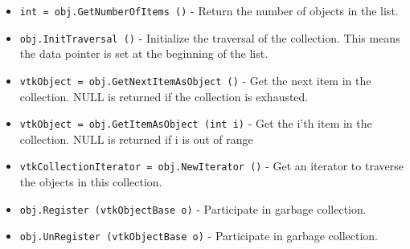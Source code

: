 \begin{itemize}
\item  \verb|int = obj.GetNumberOfItems ()| -  Return the number of objects in the list.

\item  \verb|obj.InitTraversal ()| -  Initialize the traversal of the collection. This means the data pointer
 is set at the beginning of the list.

\item  \verb|vtkObject = obj.GetNextItemAsObject ()| -  Get the next item in the collection. NULL is returned if the collection
 is exhausted.

\item  \verb|vtkObject = obj.GetItemAsObject (int i)| -  Get the i'th item in the collection. NULL is returned if i is out
 of range

\item  \verb|vtkCollectionIterator = obj.NewIterator ()| -  Get an iterator to traverse the objects in this collection.

\item  \verb|obj.Register (vtkObjectBase o)| -  Participate in garbage collection.

\item  \verb|obj.UnRegister (vtkObjectBase o)| -  Participate in garbage collection.

\end{itemize}
